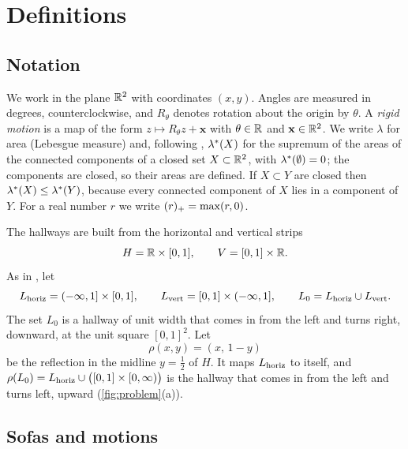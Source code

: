 \section{Definitions}\label{sec:definitions}

\subsection{Notation}

We work in the plane $\mathbb{R}^2$ with coordinates $(x,y)$. Angles are measured in degrees, counterclockwise, and $R_\theta$ denotes rotation about the origin by $\theta$. A \emph{rigid motion} is a map of the form $z\mapsto R_\theta z+\mathbf{x}$ with $\theta\in\mathbb{R}$ and $\mathbf{x}\in\mathbb{R}^2$. We write $\lambda$ for area (Lebesgue measure) and, following \cite{kallusromik2018}, $\lambda^{*}(X)$ for the supremum of the areas of the connected components of a closed set $X\subset\mathbb{R}^2$, with $\lambda^{*}(\emptyset)=0$; the components are closed, so their areas are defined. If $X\subset Y$ are closed then $\lambda^{*}(X)\le\lambda^{*}(Y)$, because every connected component of $X$ lies in a component of $Y$. For a real number $r$ we write $(r)_{+}=\max(r,0)$.

The hallways are built from the horizontal and vertical strips
\[
H=\mathbb{R}\times[0,1], \qquad V=[0,1]\times\mathbb{R} .
\]
As in \cite{kallusromik2018,romik2018}, let
\[
L_{\mathrm{horiz}}=(-\infty,1]\times[0,1], \qquad L_{\mathrm{vert}}=[0,1]\times(-\infty,1], \qquad L_0=L_{\mathrm{horiz}}\cup L_{\mathrm{vert}} .
\]
The set $L_0$ is a hallway of unit width that comes in from the left and turns right, downward, at the unit square $[0,1]^2$. Let
\[
\rho(x,y)=(x,\,1-y)
\]
be the reflection in the midline $y=\tfrac12$ of $H$. It maps $L_{\mathrm{horiz}}$ to itself, and $\rho(L_0)=L_{\mathrm{horiz}}\cup\big([0,1]\times[0,\infty)\big)$ is the hallway that comes in from the left and turns left, upward (\cref{fig:problem}(a)).

\subsection{Sofas and motions}

